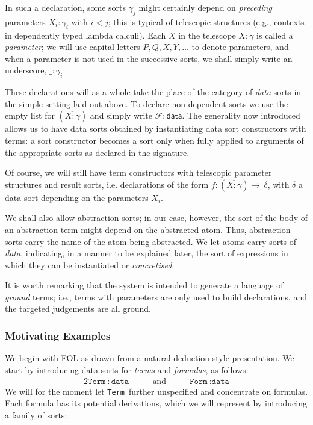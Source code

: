 \documentclass[copyright,creativecommons]{eptcs}
\newcounter{s}
\newcommand{\vect}[1]{\ensuremath{\overline{#1}}}
\newcommand{\depconstrdecl}[3]{\ensuremath{#1 : (#2) \rightarrow\ #3}}
\newcommand{\typing}[2]{\ensuremath{#1 : #2}}
\newcommand{\data}{\ensuremath{\mathsf{data}}}
\newcommand{\Trm}{\texttt{Term}}
\newcommand{\Frm}{\texttt{Form}}
\newcommand{\dta}{\texttt{data}}
\begin{document}
In such a declaration, some sorts $\gamma_j$ might certainly depend on \textit{preceding} parameters $\typing{X_i}{\gamma_i}$ with $i < j$; this is typical of telescopic structures (e.g., contexts in dependently typed lambda calculi). 
Each $X$ in the telescope $\vect{\typing{X}{\gamma}}$ is called a \emph{parameter}; we will use  capital letters $P,Q,X,Y,\ldots$ to denote parameters, and when a parameter is not used in the successive sorts, we shall simply write an underscore, $\typing{\_}{\gamma_i}$.

These
declarations will as a whole take the place of the category of \emph{data} sorts
in the simple setting laid out above.
To declare non-dependent sorts we use the empty list for
$(\vect{\typing{X}{\gamma}})$ and simply write  $\typing{\mathcal{F}}{\data}$.
The generality now introduced allows us to have data sorts obtained by instantiating 
data sort constructors with terms: a sort constructor becomes a sort only when
fully applied to arguments of the appropriate sorts as declared in the signature.


Of course, we will still have term constructors with telescopic parameter structures and result sorts, i.e. declarations of the form \depconstrdecl{f}{\vect{\typing{X}{\gamma}}}{\delta},
with $\delta$ a data sort depending on the parameters $X_i$.

We shall also allow abstraction sorts; in our case, however, the sort of the body of 
an abstraction term might depend on the abstracted atom. Thus, abstraction sorts carry
the name of the atom being abstracted. 
We let atoms carry sorts of \emph{data}, indicating, in a manner to be explained later, the sort of expressions in which they can be instantiated or \emph{concretised}.

It is worth remarking that the system is intended to generate a language of \emph{ground} terms; i.e., terms with parameters are only used to build declarations, and the targeted judgements are all ground. 

\subsubsection*{Motivating Examples}
\label{sec:motee}
We begin with FOL as drawn from a natural deduction
style presentation.
\noindent We start by introducing data sorts for \emph{terms} and \emph{formulas}, as follows:
\begin{alignat*}{2}
    \Trm~: \dta & \qquad \text{and} \qquad &
  \Frm~: \dta
\end{alignat*}
We will for the moment let \Trm\ further unspecified and concentrate on formulas. Each formula has its potential derivations, which we will represent by introducing a family of sorts:
\end{document}
